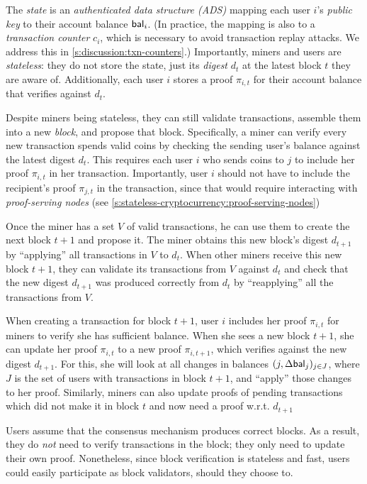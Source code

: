 The \textit{state} is an \textit{authenticated data structure (ADS)} mapping each user $i$'s \textit{public key} to their account balance $\mathsf{bal}_i$.
(In practice, the mapping is also to a \textit{transaction counter} $c_i$, which is necessary to avoid transaction replay attacks.
We address this in \cref{s:discussion:txn-counters}.)
Importantly, miners and users are \textit{stateless}: they do not store the state, just its \textit{digest} $d_t$ at the latest block $t$ they are aware of.
Additionally, each user $i$ stores a proof $\pi_{i,t}$ for their account balance that verifies against $d_t$.

Despite miners being stateless, they can still validate transactions, assemble them into a new \textit{block}, and propose that block.
Specifically, a miner can verify every new transaction spends valid coins by checking the sending user's balance against the latest digest $d_t$.
This requires each user $i$ who sends coins to $j$ to include her proof $\pi_{i,t}$ in her transaction.
Importantly, user $i$ should not have to include the recipient's proof $\pi_{j,t}$ in the transaction, since that would require interacting with \textit{proof-serving nodes} (see \cref{s:stateless-cryptocurrency:proof-serving-nodes})

Once the miner has a set $V$ of valid transactions, he can use them to create the next block ${t+1}$ and propose it.
The miner obtains this new block's digest $d_{t+1}$ by ``applying'' all transactions in $V$ to $d_t$.
When other miners receive this new block ${t+1}$, they can validate its transactions from $V$ against $d_t$ and check that the new digest $d_{t+1}$ was produced correctly from $d_t$ by ``reapplying'' all the transactions from $V$.

When creating a transaction \tx for block $t+1$, user $i$ includes her proof $\pi_{i,t}$ for miners to verify she has sufficient balance.
When she sees a new block ${t+1}$, she can update her proof $\pi_{i,t}$ to a new proof $\pi_{i,t+1}$, which verifies against the new digest $d_{t+1}$.
For this, she will look at all changes in balances $(j, \Delta\mathsf{bal}_j)_{j\in J}$, where $J$ is the set of users with transactions in block ${t+1}$, and ``apply'' those changes to her proof.
Similarly, miners can also update proofs of pending transactions which did not make it in block $t$ and now need a proof w.r.t. $d_{t+1}$

Users assume that the consensus mechanism produces correct blocks.
As a result, they do \textit{not} need to verify transactions in the block; they only need to update their own proof.
Nonetheless, since block verification is stateless and fast, users could easily participate as block validators, should they choose to.
